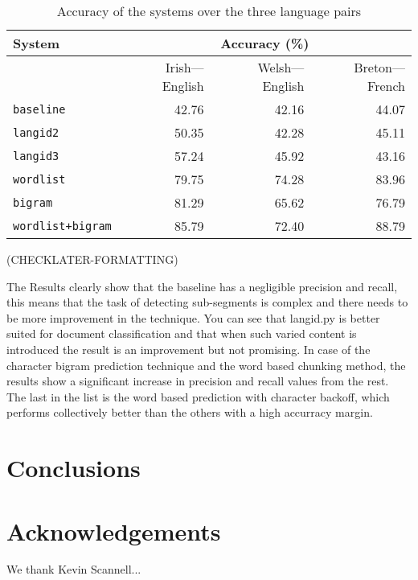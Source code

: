 \documentclass[11pt]{article}
\begin{document}
\begin{table}
\begin{center}
\begin{tabular}{|l|r|r|r|}
\hline
\textbf{System} &  \multicolumn{3}{c|}{\textbf{Accuracy} (\%)} \\
\hline
       &   Irish---English & Welsh---English & Breton---French \\ 
\hline
\texttt{baseline} & 42.76 & 42.16 & 44.07 \\
\hline
\texttt{langid2} & 50.35 & 42.28 & 45.11  \\
\hline
\texttt{langid3} & 57.24 & 45.92 & 43.16 \\
\hline
\texttt{wordlist} & 79.75 & 74.28 & 83.96 \\
\hline
\texttt{bigram} & 81.29 & 65.62 & 76.79 \\
\hline
\texttt{wordlist+bigram} & 85.79 & 72.40 & 88.79 \\
\hline
\end{tabular}
\end{center}
\label{table:accuracy}
\caption{Accuracy of the systems over the three language pairs}
\end{table}


(CHECKLATER-FORMATTING)

The Results clearly show that the baseline has a negligible precision and recall, this means that the task of detecting sub-segments is complex and there needs to be more improvement in the technique. You can see that langid.py is better suited for document classification and that when such varied content is introduced the result is an improvement but not promising. In case of the character bigram prediction technique and the word based chunking method, the results show a significant increase in precision and recall values from the rest. The last in the list is the word based prediction with character backoff, which performs collectively better than the others with a high accurracy margin. \\


\section{Conclusions}
\label{sec:conclusions}

\section*{Acknowledgements}

We thank Kevin Scannell... 



\end{document}

